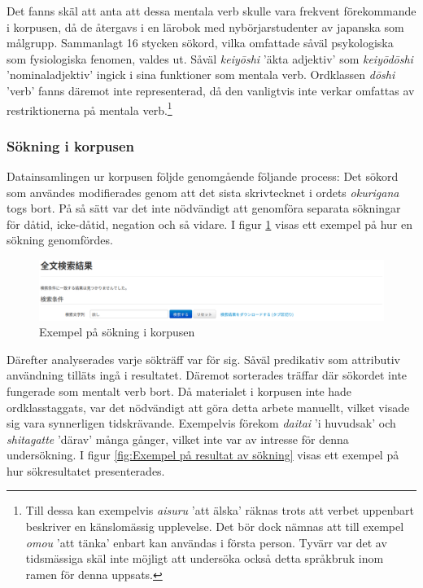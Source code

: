 \documentclass[12pt,a4paper]{article}
\begin{document}
\noindent
Det fanns skäl att anta att dessa mentala verb skulle vara frekvent förekommande i korpusen, då de återgavs i en lärobok med nybörjarstudenter av japanska som målgrupp. Sammanlagt 16 stycken sökord, vilka omfattade såväl psykologiska som fysiologiska fenomen, valdes ut. Såväl \emph{keiy\=oshi} 'äkta adjektiv' som \emph{keiy\=od\=oshi} 'nominaladjektiv' ingick i sina funktioner som mentala verb. Ordklassen \emph{d\=oshi} 'verb' fanns däremot inte representerad, då den vanligtvis inte verkar omfattas av restriktionerna på mentala verb.\footnote{Till dessa kan exempelvis \emph{aisuru} 'att älska' räknas trots att verbet uppenbart beskriver en känslomässig upplevelse. Det bör dock nämnas att till exempel \emph{omou} 'att tänka' enbart kan användas i första person. Tyvärr var det av tidsmässiga skäl inte möjligt att undersöka också detta språkbruk inom ramen för denna uppsats.}

\subsubsection{Sökning i korpusen}
\label{subsec:Undersökningen: Tillvägagångssätt: Sökning i korpusen}
Datainsamlingen ur korpusen följde genomgående följande process: Det sökord som användes modifierades genom att det sista skrivtecknet i ordets \emph{okurigana} togs bort. På så sätt var det inte nödvändigt att genomföra separata sökningar för dåtid, icke-dåtid, negation och så vidare. I figur \ref{fig:Exempel på sökning} visas ett exempel på hur en sökning genomfördes.

\begin{figure}[h]
\caption{Exempel på sökning i korpusen}
\label{fig:Exempel på sökning}
\includegraphics[width=\textwidth]{images/Exempel på sökning}
\end{figure}

\noindent
Därefter analyserades varje sökträff var för sig. Såväl predikativ som attributiv användning tilläts ingå i resultatet. Däremot sorterades träffar där sökordet inte fungerade som mentalt verb bort. Då materialet i korpusen inte hade ordklasstaggats, var det nödvändigt att göra detta arbete manuellt, vilket visade sig vara synnerligen tidskrävande. Exempelvis förekom \emph{daitai} 'i huvudsak' och \emph{shitagatte} 'därav' många gånger, vilket inte var av intresse för denna undersökning. I figur \ref{fig:Exempel på resultat av sökning} visas ett exempel på hur sökresultatet presenterades.
\end{document}
